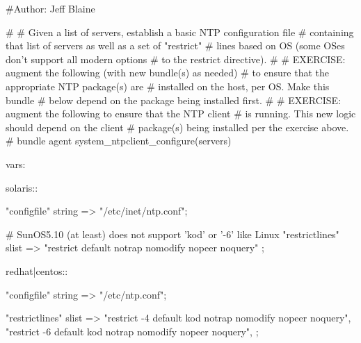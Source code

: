 \begin{codelisting}
\end{codelisting}
\begin{codelisting}
\begin{code}
#Author: Jeff Blaine

#
# Given a list of servers, establish a basic NTP configuration file
# containing that list of servers as well as a set of "restrict"
# lines based on OS (some OSes don't support all modern options
# to the restrict directive).
#
# EXERCISE: augment the following (with new bundle(s) as needed)
#           to ensure that the appropriate NTP package(s) are
#           installed on the host, per OS.  Make this bundle
#           below depend on the package being installed first.
#
# EXERCISE: augment the following to ensure that the NTP client
#           is running.  This new logic should depend on the client
#           package(s) being installed per the exercise above.
#
bundle agent system_ntpclient_configure(servers)
{
  vars:

    solaris::

      "configfile" string => "/etc/inet/ntp.conf";

      # SunOS5.10 (at least) does not support 'kod' or '-6' like Linux
      "restrictlines"
        slist => { "restrict default notrap nomodify nopeer noquery" };

    redhat|centos::

      "configfile" string => "/etc/ntp.conf";

      "restrictlines"
        slist => {
                   "restrict -4 default kod notrap nomodify nopeer noquery",
                   "restrict -6 default kod notrap nomodify nopeer noquery",
                 };

}
\end{code}
\end{codelisting}

